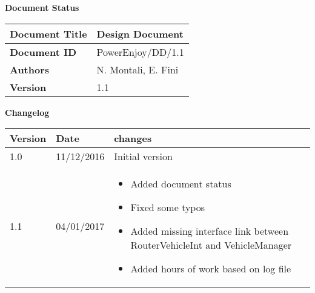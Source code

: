 \textbf{\Huge Document Status}
\begin{center}
    \begin{tabular}{ | l | p{10cm} |}
    \hline
    \textbf{Document Title} & Design Document \\ \hline
    \textbf{Document ID} & PowerEnjoy/DD/1.1 \\ \hline
    \textbf{Authors} & N. Montali, E. Fini \\ \hline
    \textbf{Version} & 1.1 \\ \hline
    \end{tabular}
\textbf{\Large Changelog}
     \begin{tabular}{ | l | l | p{10cm} |}
    \hline
    \textbf{Version} & \textbf{Date} & \textbf{changes} \\ \hline
    1.0 & 11/12/2016 & Initial version \\ \hline
    1.1 & 04/01/2017 & \begin{itemize}
    	\item Added document status 
	\item Fixed some typos
	\item Added missing interface link between RouterVehicleInt and VehicleManager
	\item Added hours of work based on log file
    \end{itemize}
    \\ \hline
    \end{tabular}
\end{center}